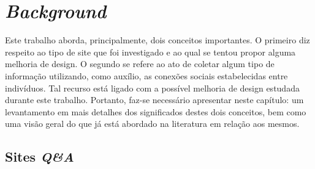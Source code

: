 \chapter{\textit{Background}}
Este trabalho aborda, principalmente, dois conceitos importantes. O primeiro diz respeito ao tipo de site que foi investigado e ao qual se tentou propor alguma melhoria de design. O segundo se refere ao ato de coletar algum tipo de informação utilizando, como auxílio, as conexões sociais estabelecidas entre indivíduos. Tal recurso está ligado com a possível melhoria de design estudada durante este trabalho. Portanto, faz-se necessário apresentar neste capítulo: um levantamento em mais detalhes dos significados destes dois conceitos, bem como uma visão geral do que já está abordado na literatura em relação aos mesmos.

\section{Sites \textit{Q\&A}}





